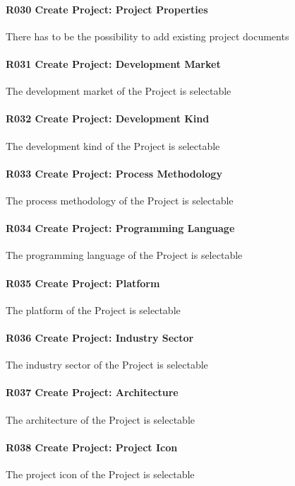 \paragraph{R030 Create Project: Project Properties}
There has to be the possibility to add existing project documents

\paragraph{R031 Create Project: Development Market}
The development market of the Project is selectable 

\paragraph{R032 Create Project: Development Kind}
The development kind of the Project is selectable 

\paragraph{R033 Create Project: Process Methodology}
The process methodology of the Project is selectable 

\paragraph{R034 Create Project: Programming Language}
The programming language of the Project is selectable 

\paragraph{R035 Create Project: Platform}
The platform of the Project is selectable 

\paragraph{R036 Create Project: Industry Sector}
The industry sector of the Project is selectable 

\paragraph{R037 Create Project: Architecture}
The architecture of the Project is selectable 

\paragraph{R038 Create Project: Project Icon}
The project icon of the Project is selectable 

